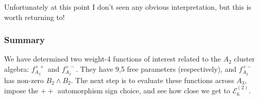 \documentclass[12pt]{article}
\begin{document}
\noindent Unfortunately at this point I don't seen any obvious interpretation, but this is worth returning to!

\subsubsection*{Summary}

We have determined two weight-4 functions of interest related to the $A_2$ cluster algebra: $f_{A_2}^{++}$ and $f_{A_2}^{+-}$. They have 9,5 free parameters (respectively), and $f_{A_2}^{+-}$ has non-zero $B_2\wedge B_2$. The next step is to evaluate these functions across $A_3$, impose the $++$ automorphism sign choice, and see how close we get to $\mathcal{E}^{(2)}_6$.
\end{document}

